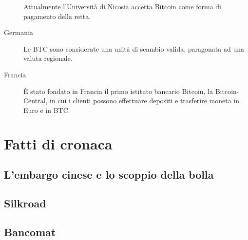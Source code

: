 \begin{description}
 Attualmente l'Università di Nicosia accetta Bitcoin come forma di pagamento della retta.
 \item[Germania] Le BTC sono considerate una unità di scambio valida, paragonata ad una valuta regionale.
 \item[Francia] È stato fondato in Francia il primo istituto bancario Bitcoin, la Bitcoin-Central, in cui i clienti possono effettuare depositi e trasferire moneta in Euro e in BTC.
\end{description}


\section{Fatti di cronaca}

\subsection{L'embargo cinese e lo scoppio della bolla}

\subsection{Silkroad}\label{silkroad}

\subsection{Bancomat}
